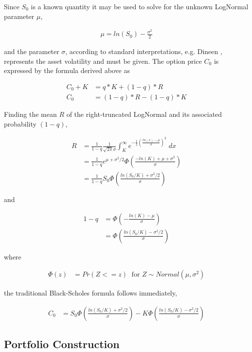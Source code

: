 Since $S_0$ is a known quantity it may be used to solve for the unknown LogNormal parameter $\mu$,

\begin{align*}
\mu = ln(S_0) - \frac{\sigma^2}{2}
\end{align*}

and the parameter $\sigma$, according to standard interpretations, e.g. Dineen \cite{dineen00}, represents the asset volatility and must be given. The option price $C_0$ is expressed by the formula derived above as

\begin{align*}
C_0 + K &= q * K + (1-q) * R\\
C_0 &= (1-q) * R - (1-q) * K
\end{align*}

Finding the mean $R$ of the right-truncated LogNormal and its associated probability $(1-q)$,

\begin{align*}
R &= \frac{1}{1-q}\frac{1}{\sqrt{2 \pi} \sigma} \int_K^\infty e^{-\frac{1}{2}(\frac{ln(x) - \mu}{\sigma})^2} \; dx\\
&= \frac{1}{1-q} e^{\mu + \sigma^2 / 2} \Phi\left(\frac{-ln(K) + \mu + \sigma^2}{\sigma}\right)\\
&= \frac{1}{1-q} S_0 \Phi\left(\frac{ln(S_0/K) + \sigma^2 / 2}{\sigma}\right)
\end{align*}

and

\begin{align*}
1-q &= \Phi\left(-\frac{ln(K)-\mu}{\sigma}\right)\\
    &= \Phi\left(\frac{ln(S_0 / K) - \sigma^2 / 2}{\sigma}\right)
\end{align*}

where

\begin{align*}
\Phi(z) &= Pr(Z <= z) \; \text{ for } Z \sim Normal(\mu, \sigma^2)
\end{align*}

the traditional Black-Scholes formula follows immediately,

\begin{align*}
C_0 &= S_0 \Phi\left(\frac{ln(S_0 / K) + \sigma^2 / 2}{\sigma}\right) - K \Phi \left(\frac{ln(S_0 / K) - \sigma^2 / 2}{\sigma}\right)
\end{align*}

\subsection{Portfolio Construction}

